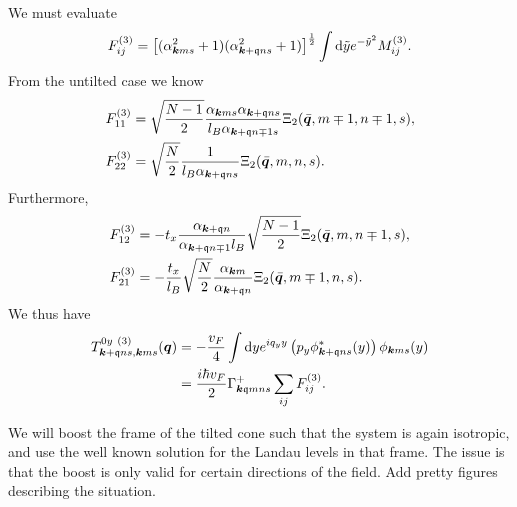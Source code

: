 We must evaluate
\begin{equation}
  \label{eq:59}
  F^{(3)}_{ij} = \left[(\alpha_{\bm{k} m s}^2  + 1) ( \alpha _{\bm{k} + \mathfrak{q} ns}^2 + 1 )\right]^{\frac{1}{2}} \int \mathrm{d} \tilde{y} e^{-\tilde{y}^2} M^{(3)}_{ij}.
\end{equation}
From the untilted case we know
\begin{align}
  F^{(3)}_{11} &= \sqrt{\frac{N-1}{2}}
                 \frac{\alpha_{\bm{k} m s} \alpha_{\bm{k}+\mathfrak{q} n s}}{l_{B} \alpha _{\bm{k} + \mathfrak{q} n \mp 1 s}}
                 \Xi_2( \bar{\bm{q}}, m\mp 1, n\mp 1, s ),\\
  F^{(3)}_{22} &= \sqrt{\frac{N}{2}}
                 \frac{1}{l_{B} \alpha _{\bm{k} + \mathfrak{q} n s}}
                 \Xi_{2} (\bar{\bm{q}}, m, n, s).
\end{align}
Furthermore,
\begin{align}
  F^{(3)}_{12} &= -t_x \frac{\alpha _{\bm{k} + \mathfrak{q} n}}{\alpha _{\bm{k}+\mathfrak{q} n \mp 1} l_{B}}
                 \sqrt{\frac{N-1}{2}}
                 \Xi_{2} (\bar{\bm{q}}, m, n \mp 1, s),\\
  F^{(3)}_{21} &= -\frac{t_x}{l_{B}}
                 \sqrt{\frac{N}{2}}
                 \frac{\alpha_{\bm{k} m}}{\alpha _{\bm{k} + \mathfrak{q} n}}
                 \Xi_2 ( \bar{\bm{q}}, m \mp 1, n, s ).
\end{align}
We thus have
\begin{align}
  \label{eq:60}
  T^{0y~(3)}_{\bm{k} + \mathfrak{q} ns, \bm{k} ms} (\bm{q})
  &= - \frac{v_F}{4}
    \int \mathrm{d} y
    e^{i q_y y}
    \left( p_y \phi ^{*}_{\bm{k} + \mathfrak{q} ns}(y) \right) \phi _{\bm{k} m s}(y)\\
  &= \frac{i \hbar v_F}{2}
    \Gamma ^{+}_{\bm{k} \mathfrak{q} m n s}
    \sum\limits_{ij}^{} F^{(3)}_{ij}.
\end{align}











We will boost the frame of the tilted cone such that the system is again isotropic, and use the well known solution for the Landau levels in that frame.
The issue is that the boost is only valid for certain directions of the field.
Add pretty figures describing the situation.

